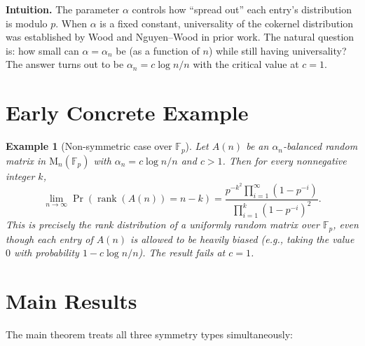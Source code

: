 \documentclass[11pt,a4paper]{article}
\newtheorem{example}[theorem]{Example}
\begin{document}
\noindent\textbf{Intuition.}
The parameter $\alpha$ controls how ``spread out'' each entry's distribution is modulo $p$. When $\alpha$ is a fixed constant, universality of the cokernel distribution was established by Wood and Nguyen--Wood in prior work. The natural question is: how small can $\alpha = \alpha_n$ be (as a function of $n$) while still having universality? The answer turns out to be $\alpha_n = c\log n / n$ with the critical value at $c=1$.

\section{Early Concrete Example}

\begin{example}[Non-symmetric case over $\mathbb{F}_p$]
Let $A(n)$ be an $\alpha_n$-balanced random matrix in $\mathrm{M}_n(\mathbb{F}_p)$ with $\alpha_n = c\log n/n$ and $c > 1$. Then for every nonnegative integer $k$,
\[
\lim_{n\to\infty} \Pr(\operatorname{rank}(A(n)) = n-k) = \frac{p^{-k^2}\prod_{i=1}^\infty (1-p^{-i})}{\prod_{i=1}^k (1-p^{-i})^2}.
\]
This is precisely the rank distribution of a \emph{uniformly random} matrix over $\mathbb{F}_p$, even though each entry of $A(n)$ is allowed to be heavily biased (e.g., taking the value $0$ with probability $1 - c\log n/n$). The result fails at $c=1$.
\end{example}

\section{Main Results}

The main theorem treats all three symmetry types simultaneously:
\end{document}
